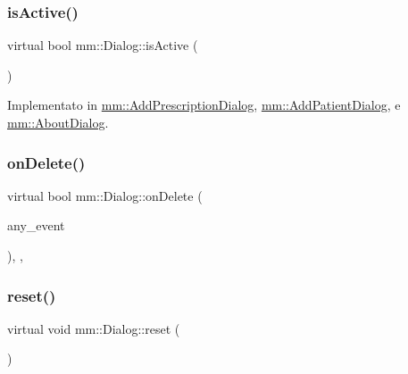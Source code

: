 \mbox{\label{classmm_1_1_dialog_a22abaf4e90b6fdca5c20039f6b9e15ac}} 
\subsubsection{\texorpdfstring{is\+Active()}{isActive()}}
{\footnotesize\ttfamily virtual bool mm\+::\+Dialog\+::is\+Active (\begin{DoxyParamCaption}{ }\end{DoxyParamCaption})\hspace{0.3cm}{\ttfamily [pure virtual]}}



Implementato in \mbox{\hyperlink{classmm_1_1_add_prescription_dialog_a4ff93500e8fd90512dc4575147b2c910}{mm\+::\+Add\+Prescription\+Dialog}}, \mbox{\hyperlink{classmm_1_1_add_patient_dialog_a459a8acbec1c8a5a87e00f23402d3b5d}{mm\+::\+Add\+Patient\+Dialog}}, e \mbox{\hyperlink{classmm_1_1_about_dialog_adc8aec0378d9d146c78eaf9a204dbf27}{mm\+::\+About\+Dialog}}.

\mbox{\label{classmm_1_1_dialog_a9864219c61623b484d8f8c161808e136}} 
\subsubsection{\texorpdfstring{on\+Delete()}{onDelete()}}
{\footnotesize\ttfamily virtual bool mm\+::\+Dialog\+::on\+Delete (\begin{DoxyParamCaption}\item[{Gdk\+Event\+Any $\ast$}]{any\+\_\+event }\end{DoxyParamCaption})\hspace{0.3cm}{\ttfamily [inline]}, {\ttfamily [protected]}, {\ttfamily [virtual]}}

\mbox{\label{classmm_1_1_dialog_abe6e5ac072c12c06971f60491f079d80}} 
\subsubsection{\texorpdfstring{reset()}{reset()}}
{\footnotesize\ttfamily virtual void mm\+::\+Dialog\+::reset (\begin{DoxyParamCaption}{ }\end{DoxyParamCaption})\hspace{0.3cm}{\ttfamily [pure virtual]}}



